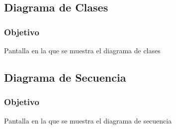 \newpage
\subsection{Diagrama de Clases}

\subsubsection{Objetivo}
	Pantalla en la que se muestra el diagrama de clases  
	

\subsection{Diagrama de Secuencia}

\subsubsection{Objetivo}
	Pantalla en la que se muestra el diagrama de secuencia
	

